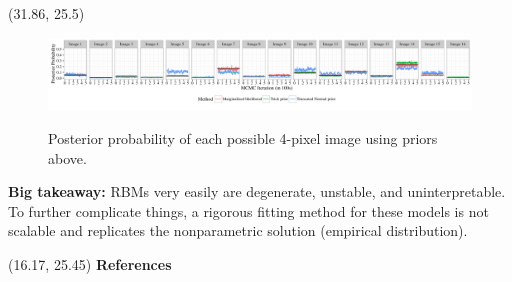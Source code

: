 \documentclass[extrafontsizes, 30pt]{memoir}
\begin{document}
\begin{textblock}{14.54}(31.86, 25.5)
\begin{figure}
\centering
\includegraphics{images/image_prediction.pdf}
\label{fig:image_pred}
\vspace*{-15mm}
\caption{Posterior probability of each possible 4-pixel image using priors above.}
\end{figure}

{\bfseries Big takeaway:} RBMs very easily are degenerate, unstable, and uninterpretable. To further complicate things, a rigorous fitting method for these models is not scalable and replicates the nonparametric solution (empirical distribution).
\end{textblock}







\begin{textblock}{14.5}(16.17, 25.45)
{\large \bfseries References}
\printbibliography[heading=none]

\end{textblock}
\end{document}
